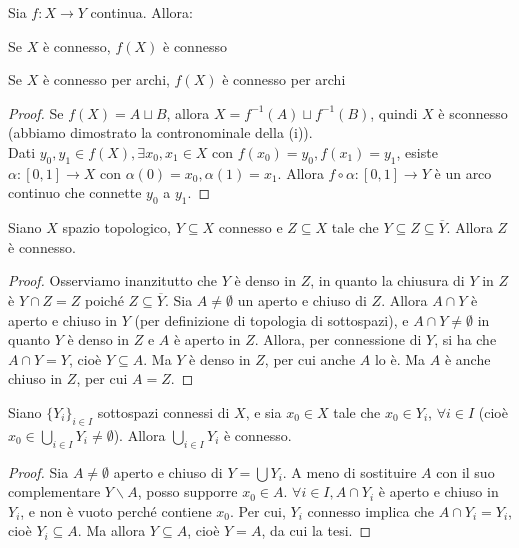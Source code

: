 \begin{prop}
Sia $f:X\longrightarrow Y$ continua. Allora:
\begin{nlist}
\item Se $X$ è connesso, $f(X)$ è connesso
\item Se $X$ è connesso per archi, $f(X)$ è connesso per archi
\end{nlist}
\end{prop}
\begin{proof}
Se $f(X)=A \sqcup B$, allora $X=f^{-1}(A) \sqcup f^{-1}(B)$, quindi $X$ è sconnesso (abbiamo dimostrato la contronominale della (i)). \\
Dati $y_0,y_1 \in f(X), \exists x_0, x_1 \in X$ con $f(x_0)=y_0, f(x_1)=y_1$, esiste $\alpha:[0,1]\longrightarrow X$ con $\alpha (0)=x_0, \alpha (1)=x_1$. Allora $f \circ \alpha:[0,1] \longrightarrow Y$ è un arco continuo che connette $y_0$ a $y_1$.
\end{proof}

\begin{lm}
Siano $X$ spazio topologico, $Y \subseteq X$ connesso e $Z \subseteq X$ tale che $Y \subseteq Z \subseteq \overline{Y}$. Allora $Z$ è connesso.
\end{lm}
\begin{proof}
Osserviamo inanzitutto che $Y$ è denso in $Z$, in quanto la chiusura di $Y$ in $Z$ è $Y \cap Z=Z$ poiché $Z \subseteq \overline{Y}$. Sia $A \neq \emptyset$ un aperto e chiuso di $Z$. Allora $A \cap Y$ è aperto e chiuso in $Y$ (per definizione di topologia di sottospazi), e $A \cap Y \neq \emptyset$ in quanto $Y$ è denso in $Z$ e $A$ è aperto in $Z$. Allora, per connessione di $Y$, si ha che $A \cap Y=Y$, cioè $Y \subseteq A$. Ma $Y$ è denso in $Z$, per cui anche $A$ lo è. Ma $A$ è anche chiuso in $Z$, per cui $A=Z$.
\end{proof}

\begin{lm}
Siano $\{Y_i\}_{i \in I}$ sottospazi connessi di $X$, e sia $x_0 \in X$ tale che $x_0 \in Y_i$, $\forall i \in I$ (cioè $x_0 \in \bigcup _{i \in I} Y_i \neq \emptyset$). Allora $\bigcup _{i \in I} Y_i$ è connesso.
\end{lm}
\begin{proof}
Sia $A \neq \emptyset$ aperto e chiuso di $Y=\bigcup Y_i$. A meno di sostituire $A$ con il suo complementare $Y \smallsetminus A$, posso supporre $x_0 \in A$. $\forall i \in I, A \cap Y_i$ è aperto e chiuso in $Y_i$, e non è vuoto perché contiene $x_0$. Per cui, $Y_i$ connesso implica che $A \cap Y_i=Y_i$, cioè $Y_i \subseteq A$. Ma allora $Y \subseteq A$, cioè $Y=A$, da cui la tesi.
\end{proof}

